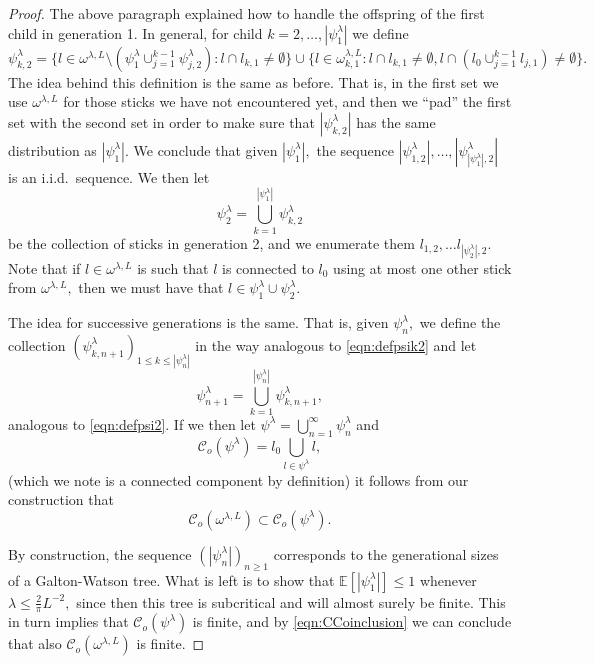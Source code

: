 \documentclass[a4paper,12pt]{article}
\newcommand{\BE}{{\mathbb{E}}}
\newcommand{\CC}{{\mathcal{C}}}
\begin{document}
\begin{proof}
The above paragraph explained how to handle the offspring of the first child in 
generation 1. In general, for child $k=2,\ldots,|\psi^\lambda_1|$ we define
\begin{equation}\label{eqn:defpsik2}
    \psi^\lambda_{k,2} =\{l\in \omega^{\lambda,L}\setminus 
\left(\psi^\lambda_1 \cup_{j=1}^{k-1} \psi^\lambda_{j,2}\right): 
l\cap l_{k,1} \neq \emptyset\} 
\cup 
\{l\in \omega^{\lambda,L}_{k,1}: l \cap l_{k,1} \neq \emptyset, 
l \cap \left(l_0\cup_{j=1}^{k-1} l_{j,1}\right)\neq \emptyset\}.
\end{equation}  
The idea behind this definition is the same as before. That is, in the first set 
we use $\omega^{\lambda,L}$ for those sticks we have not encountered yet, and 
then we ``pad'' the first set with the second set in order to make sure that 
$|\psi^\lambda_{k,2}|$ has the same 
distribution as $|\psi^\lambda_1|.$ We conclude that given $|\psi^\lambda_1|,$ the sequence
$|\psi^\lambda_{1,2}|,\ldots, |\psi^\lambda_{|\psi^\lambda_1|,2}|$ is an i.i.d.\ 
sequence. We then let
\begin{equation} \label{eqn:defpsi2}
   \psi^\lambda_2=\bigcup_{k=1}^{|\psi^\lambda_1|} \psi^\lambda_{k,2}
\end{equation} 
be the collection of sticks in generation 2, and we enumerate them 
$l_{1,2},\ldots l_{|\psi^\lambda_2|,2}.$ Note that if $l\in \omega^{\lambda,L}$
is such that $l$ is connected to $l_0$ using at most one other stick from 
$\omega^{\lambda,L},$ then we must have that $l\in \psi^\lambda_1 \cup \psi^\lambda_{2}.$

The idea for successive generations is the same. That is, given $\psi^\lambda_n,$ 
we define the collection $(\psi^\lambda_{k,n+1})_{1\leq k\leq |\psi^\lambda_n|}$ in the 
way analogous to \eqref{eqn:defpsik2} and let 
\[
\psi^\lambda_{n+1}=\bigcup_{k=1}^{|\psi^\lambda_n|} \psi^\lambda_{k,n+1},
\]
analogous to \eqref{eqn:defpsi2}.
If we then let $\psi^\lambda=\bigcup_{n=1}^\infty \psi^\lambda_n$ and 
\[
\CC_o(\psi^\lambda)=l_0 \bigcup_{l \in \psi^\lambda} l,
\]
(which we note is a connected component by definition) it follows from our 
construction that
\begin{equation} \label{eqn:CCoinclusion} 
 \CC_o(\omega^{\lambda,L}) \subset \CC_o(\psi^\lambda).   
\end{equation}


By construction, the sequence $(|\psi^\lambda_n|)_{n\geq 1}$ corresponds to the 
generational sizes of a Galton-Watson tree. What is left is to show that 
$\BE[|\psi^\lambda_1|]\leq 1$ whenever $\lambda\leq \frac{2}{\pi} L^{-2},$ since then this tree is 
subcritical and will almost surely be finite. This in turn implies that 
$\CC_o(\psi^\lambda)$ is finite, and by \eqref{eqn:CCoinclusion} 
we can conclude that also $\CC_o(\omega^{\lambda,L})$ is finite. 


\end{proof}
\end{document}
